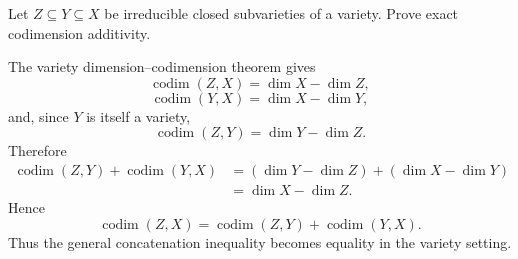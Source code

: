 \begin{problem}\label{prob:vi31-17}
Let \(Z\subseteq Y\subseteq X\) be irreducible closed subvarieties of a variety. Prove exact codimension additivity.
\end{problem}

\ifdefined\FullProblemDossiers
\begin{solution}
The variety dimension--codimension theorem gives
\[
\operatorname{codim}(Z,X)=\dim X-\dim Z,
\]
\[
\operatorname{codim}(Y,X)=\dim X-\dim Y,
\]
and, since \(Y\) is itself a variety,
\[
\operatorname{codim}(Z,Y)=\dim Y-\dim Z.
\]
Therefore
\[
\begin{aligned}
\operatorname{codim}(Z,Y)+\operatorname{codim}(Y,X)
&=(\dim Y-\dim Z)+(\dim X-\dim Y)\\
&=\dim X-\dim Z.
\end{aligned}
\]
Hence
\[
\boxed{
\operatorname{codim}(Z,X)
=
\operatorname{codim}(Z,Y)+\operatorname{codim}(Y,X).
}
\]
Thus the general concatenation inequality becomes equality in the variety setting.
\end{solution}
\fi
